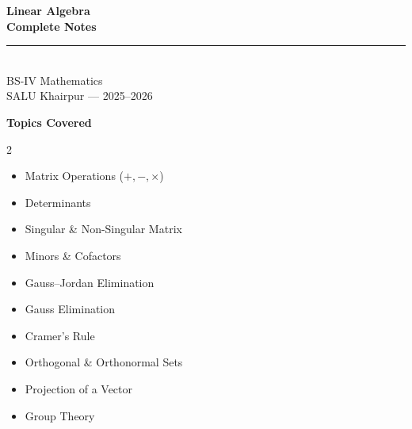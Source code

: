 \documentclass[12pt]{article}
\begin{document}
\thispagestyle{empty}

\begin{tcolorbox}[
  enhanced, arc=0pt, boxrule=0pt,
  colback=primary, colframe=primary,
  left=20pt, right=20pt, top=28pt, bottom=20pt,
  borderline south={5pt}{0pt}{accent},
]
  \centering
  {\fontsize{26}{32}\bfseries\color{white}
    Linear Algebra\\[8pt]
    Complete Notes
  }\\[12pt]
  {\color{accent!60}\rule{0.5\textwidth}{0.8pt}}\\[10pt]
  {\large\color{white!80}BS-IV Mathematics}\\[6pt]
  {\normalsize\color{white!60}SALU Khairpur --- 2025--2026}
\end{tcolorbox}

\vspace{16pt}

\begin{tcolorbox}[
  enhanced, arc=6pt, boxrule=1pt,
  colback=lightbg, colframe=accent!60,
  left=14pt, right=14pt, top=10pt, bottom=10pt,
]
  \centering
  {\large\bfseries\color{primary} Topics Covered}\\[6pt]
  \begin{multicols}{2}
  \begin{itemize}[leftmargin=14pt, itemsep=3pt]
    \item[\textcolor{accent}{$\blacktriangleright$}] Matrix Operations ($+,-,\times$)
    \item[\textcolor{accent}{$\blacktriangleright$}] Determinants
    \item[\textcolor{accent}{$\blacktriangleright$}] Singular \& Non-Singular Matrix
    \item[\textcolor{accent}{$\blacktriangleright$}] Minors \& Cofactors
    \item[\textcolor{accent}{$\blacktriangleright$}] Gauss--Jordan Elimination
    \item[\textcolor{accent}{$\blacktriangleright$}] Gauss Elimination
    \item[\textcolor{accent}{$\blacktriangleright$}] Cramer's Rule
    \item[\textcolor{accent}{$\blacktriangleright$}] Orthogonal \& Orthonormal Sets
    \item[\textcolor{accent}{$\blacktriangleright$}] Projection of a Vector
    \item[\textcolor{accent}{$\blacktriangleright$}] Group Theory
  \end{itemize}
  \end{multicols}
\end{tcolorbox}
\end{document}

